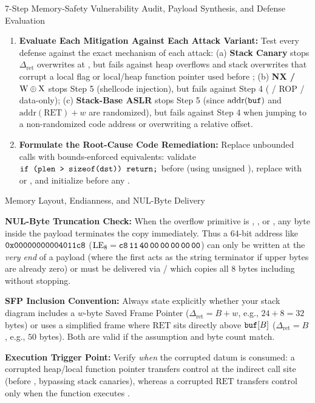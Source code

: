 \begin{schemebox}{7-Step Memory-Safety Vulnerability Audit, Payload Synthesis, and Defense Evaluation}
\begin{enumerate}[label=\textbf{Step \arabic*:}, leftmargin=3.8em]
  \item \textbf{Evaluate Each Mitigation Against Each Attack Variant:}
  Test every defense against the exact mechanism of each attack: (a) \textbf{Stack Canary} stops $\Delta_{\text{ret}}$ overwrites at , but fails against heap overflows and stack overwrites that corrupt a local flag or local/heap function pointer used before ; (b) \textbf{NX / $\text{W}\oplus\text{X}$} stops Step 5 (shellcode injection), but fails against Step 4 ( / ROP / data-only); (c) \textbf{Stack-Base ASLR} stops Step 5 (since $\mathrm{addr}(\texttt{buf})$ and $\mathrm{addr}(\mathrm{RET})+w$ are randomized), but fails against Step 4 when jumping to a non-randomized code address or overwriting a relative offset.

  \item \textbf{Formulate the Root-Cause Code Remediation:}
  Replace unbounded calls with bounds-enforced equivalents: validate $\texttt{if (plen > sizeof(dst)) return;}$ before  (using unsigned ), replace  with  or , and initialize  before any .
\end{enumerate}
\end{schemebox}

\begin{verifybox}{Memory Layout, Endianness, and NUL-Byte Delivery}
\begin{compactitem}
  \item \textbf{NUL-Byte Truncation Check:} When the overflow primitive is , , or , any  byte inside the payload terminates the copy immediately. Thus a 64-bit address like $\texttt{0x00000000004011c8}$ ($\mathrm{LE}_8 = \texttt{c8\,11\,40\,00\,00\,00\,00\,00}$) can only be written at the \emph{very end} of a  payload (where the first  acts as the string terminator if upper bytes are already zero) or must be delivered via / which copies all 8 bytes including  without stopping.
  \item \textbf{SFP Inclusion Convention:} Always state explicitly whether your stack diagram includes a $w$-byte Saved Frame Pointer ($\Delta_{\text{ret}} = B + w$, e.g., $24 + 8 = 32$ bytes) or uses a simplified frame where $\mathrm{RET}$ sits directly above $\texttt{buf}[B]$ ($\Delta_{\text{ret}} = B$, e.g., $50$ bytes). Both are valid if the assumption and byte count match.
  \item \textbf{Execution Trigger Point:} Verify \emph{when} the corrupted datum is consumed: a corrupted heap/local function pointer  transfers control at the indirect call site (before , bypassing stack canaries), whereas a corrupted $\mathrm{RET}$ transfers control only when the function executes .
\end{compactitem}
\end{verifybox}

